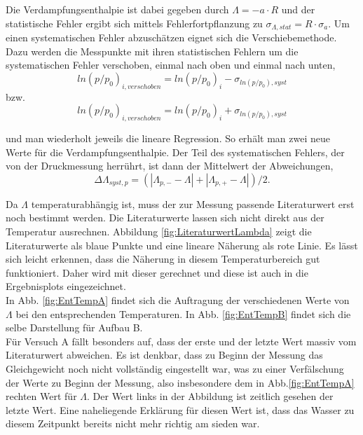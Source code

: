 \documentclass[12pt,a4paper]{article}
\begin{document}
Die Verdampfungsenthalpie ist dabei gegeben durch $\Lambda=-a \cdot R$ und der statistische Fehler ergibt sich mittels Fehlerfortpflanzung zu $\sigma_{\Lambda, stat}=R \cdot \sigma_a$. Um einen systematischen Fehler abzuschätzen eignet sich die Verschiebemethode. Dazu werden die Messpunkte mit ihren statistischen Fehlern um die systematischen Fehler verschoben, einmal nach oben und einmal nach unten,   \\

\begin{equation}
	ln(p/p_0)_{i, verschoben} = ln(p/p_0)_{i} - \sigma _{ln(p/p_0), syst}
\end{equation}
bzw.
\begin{equation}
	ln(p/p_0)_{i, verschoben} = ln(p/p_0)_{i} + \sigma _{ln(p/p_0), syst}
\end{equation}

und man wiederholt jeweils die lineare Regression. So erhält man zwei neue Werte für die Verdampfungsenthalpie. Der Teil des systematischen Fehlers, der von der Druckmessung herrührt, ist dann der Mittelwert der Abweichungen,
\begin{equation}
	\Delta \Lambda _{syst,p} = ( |\Lambda_{p,-}-\Lambda| + |\Lambda_{p,+} - \Lambda|)/2 .
\end{equation}

Da $\Lambda$ temperaturabhängig ist, muss der zur Messung passende Literaturwert erst noch bestimmt werden. Die Literaturwerte lassen sich nicht direkt aus der Temperatur ausrechnen. Abbildung \ref{fig:LiteraturwertLambda} zeigt die Literaturwerte als blaue Punkte und eine lineare Näherung als rote Linie. Es lässt sich leicht erkennen, dass die Näherung in diesem Temperaturbereich gut funktioniert. Daher wird mit dieser gerechnet und diese ist auch in die Ergebnisplots eingezeichnet. \\
In Abb. \ref{fig:EntTempA} findet sich die Auftragung der verschiedenen Werte von $\Lambda$ bei den entsprechenden Temperaturen. In Abb. \ref{fig:EntTempB} findet sich die selbe Darstellung für Aufbau B.\\

Für Versuch A fällt besonders auf, dass der erste und der letzte Wert massiv vom Literaturwert abweichen. Es ist denkbar, dass zu Beginn der Messung das Gleichgewicht noch nicht vollständig eingestellt war, was zu einer Verfälschung der Werte zu Beginn der Messung, also insbesondere dem in Abb.\ref{fig:EntTempA} rechten Wert für $\Lambda$.
Der Wert links in der Abbildung ist zeitlich gesehen der letzte Wert. Eine naheliegende Erklärung für diesen Wert ist, dass das Wasser zu diesem Zeitpunkt bereits nicht mehr richtig am sieden war.\\
\end{document}
